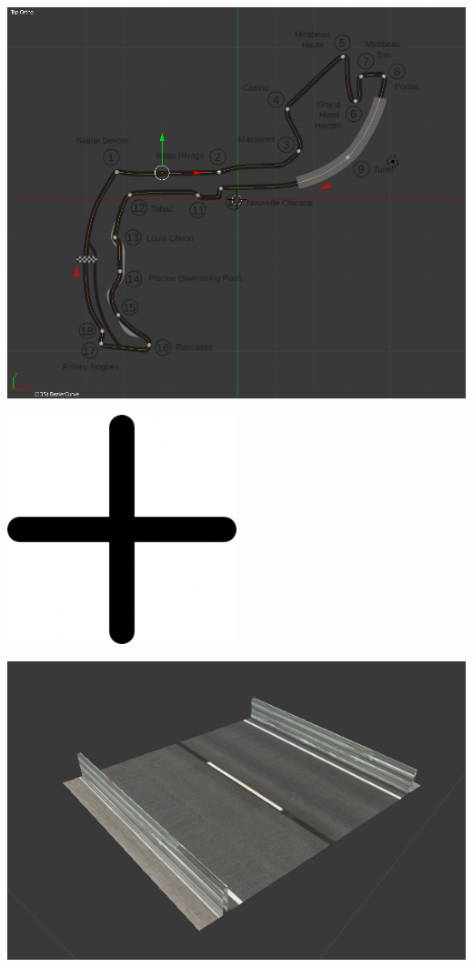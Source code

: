 \documentclass[notes,slidesec,a4]{seminar}
\begin{document}
\begin{hslide}
	\begin{minipage}{0.5\textwidth}
		\includegraphics[width=\textwidth]{MonacoTrazado.png}
	\end{minipage}
	\begin{minipage}{0.1\textwidth}
		\begin{center}
			\includegraphics[width=0.5\textwidth]{mas.jpg}
		\end{center}
	\end{minipage}
	\begin{minipage}{0.5\textwidth}
		\includegraphics[width=\textwidth]{MonacoSegmento.png}
	\end{minipage}
\end{hslide}
\end{document}
